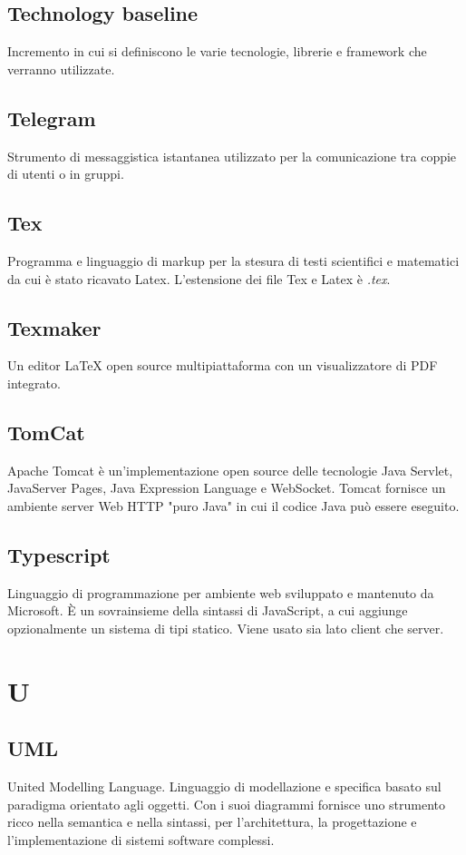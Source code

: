 \subsection*{Technology baseline}
Incremento in cui si definiscono le varie tecnologie, librerie e framework che verranno utilizzate.


\subsection*{Telegram}
Strumento di messaggistica istantanea utilizzato per la comunicazione tra coppie di utenti o in gruppi.

\subsection*{Tex}
Programma e linguaggio di markup per la stesura di testi scientifici e matematici da cui è stato ricavato Latex. L'estensione dei file Tex e Latex è \textit{.tex}.

\subsection*{Texmaker}
Un editor LaTeX open source multipiattaforma con un visualizzatore di PDF integrato.

\subsection*{TomCat}
Apache Tomcat è un'implementazione open source delle tecnologie Java Servlet, JavaServer Pages, Java Expression Language e WebSocket. Tomcat fornisce un ambiente server Web HTTP "puro Java" in cui il codice Java può essere eseguito.

\subsection*{Typescript}
Linguaggio di programmazione per ambiente web sviluppato e mantenuto da Microsoft. È un sovrainsieme della sintassi di JavaScript, a cui aggiunge opzionalmente un sistema di tipi statico. Viene usato sia lato client che server.

\newpage
\section{U}

\subsection*{UML}
United Modelling Language. Linguaggio di modellazione e specifica basato sul paradigma orientato agli oggetti. Con i suoi diagrammi fornisce uno strumento  ricco nella semantica e nella sintassi, per l'architettura, la progettazione e l'implementazione di sistemi software complessi.

